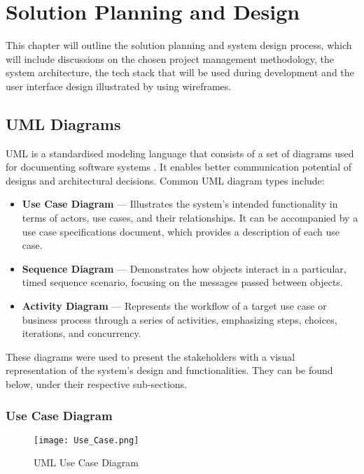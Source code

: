 \chapter{Solution Planning and Design}

This chapter will outline the solution planning and system design process, which will include discussions on the chosen project management methodology, the system architecture, the tech stack that will be used during development and the user interface design illustrated by using wireframes.

\section{UML Diagrams}

UML is a standardised modeling language that consists of a set of diagrams used for documenting software systems \parencite{uml}. It enables better communication potential of designs and architectural decisions. Common UML diagram types include:

\begin{itemize}
    \item \textbf{Use Case Diagram} --- Illustrates the system's intended functionality in terms of actors, use cases, and their relationships. It can be accompanied by a use case specifications document, which provides a description of each use case.
    \item \textbf{Sequence Diagram} --- Demonstrates how objects interact in a particular, timed sequence scenario, focusing on the messages passed between objects.
    \item \textbf{Activity Diagram} --- Represents the workflow of a target use case or business process through a series of activities, emphasizing steps, choices, iterations, and concurrency.
\end{itemize}

These diagrams were used to present the stakeholders with a visual representation of the system's design and functionalities. They can be found below, under their respective sub-sections.

\clearpage

\subsection{Use Case Diagram}
\begin{figure}[htbp]
    \centering
    \texttt{[image: Use\_Case.png]}
    \caption{UML Use Case Diagram}\label{fig:uml_usecase}
\end{figure}

